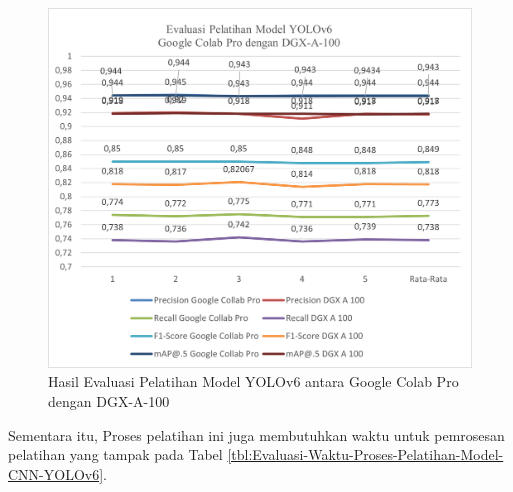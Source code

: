 \begin{figure}[H]
	\vspace{-0.1cm}
	\begin{center}
		\includegraphics[width=1\columnwidth]{bab4/Gambar/Picture26.png}
	\end{center}
	\vspace{-0.2cm}
	\captionsetup{justification=centering}
	\caption{Hasil Evaluasi Pelatihan Model YOLOv6 antara Google Colab Pro dengan DGX-A-100}\label{img:Hasil-Evaluasi-Pelatihan-Model-YOLOv6-Colab-DGX}
\end{figure}

Sementara itu, Proses pelatihan ini juga membutuhkan waktu untuk pemrosesan pelatihan yang tampak pada Tabel \ref{tbl:Evaluasi-Waktu-Proses-Pelatihan-Model-CNN-YOLOv6}.

